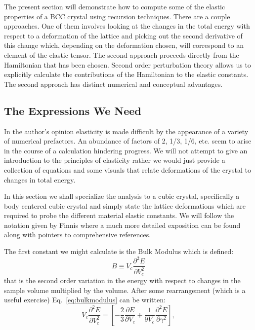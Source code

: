 The present section will demonstrate how to compute some of the elastic properties
of a BCC crystal using recursion techniques. There are a couple approaches.
One of them involves looking at the changes in the total energy with
respect to a deformation of the lattice and picking out the 
second derivative of this change which, depending on the deformation chosen,
will correspond to an element of the elastic tensor. The second approach
proceeds directly from the Hamiltonian that has been chosen. Second order
perturbation theory allows us to explicitly calculate the contributions of
the Hamiltonian to the elastic constants. The second approach has distinct
numerical and conceptual advantages.

\subsection{The Expressions We Need}
In the author's opinion elasticity is made difficult by the appearance of a variety
of numerical prefactors. An abundance of factors of 2,
1/3, 1/6, etc. seem to arise in the course of a calculation hindering progress. 
We will not attempt to give an introduction to the principles of elasticity rather
we would just provide a collection of equations and some visuals 
that relate deformations of the crystal to changes in total energy.

In this section we shall specialize the analysis to a cubic crystal, specifically a body centered cubic
crystal and simply state the lattice deformations which are required to probe the 
different material elastic constants. We will follow the notation given by Finnis where
a much more detailed exposition can be found along with pointers to comprehensive references.

The first constant we might calculate is the Bulk Modulus which is defined:
%
\begin{equation}
\label{eq:bulkmodulus}
B\equiv V_{c} \frac{\partial^{2} E}{\partial V_{c}^{2}}
\end{equation}
%
that is the second order variation in the energy with respect to changes in the 
sample volume multiplied by the volume. After some rearrangement (which is a useful
exercise) Eq.~\ref{eq:bulkmodulus} can be written:
%
\begin{equation}
V_{c}\frac{\partial^{2} E}{\partial V_{c}^{2}} = \left[-\frac{2}{3}\frac{\partial E}{\partial V_{c}}+\frac{1}{9V_{c}}\frac{\partial^{2}E}{\partial \gamma^{2}} \right],
\end{equation}

